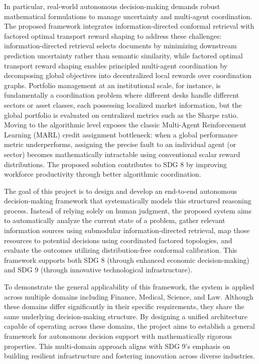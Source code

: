 \documentclass[12pt,a4paper,oneside]{report}
\theoremstyle{definition}
\theoremstyle{remark}
\begin{document}
In particular, real-world autonomous decision-making demands robust mathematical formulations to manage uncertainty and multi-agent coordination. The proposed framework integrates information-directed conformal retrieval with factored optimal transport reward shaping to address these challenges: information-directed retrieval selects documents by minimizing downstream prediction uncertainty rather than semantic similarity, while factored optimal transport reward shaping enables principled multi-agent coordination by decomposing global objectives into decentralized local rewards over coordination graphs. Portfolio management at an institutional scale, for instance, is fundamentally a coordination problem where different desks handle different sectors or asset classes, each possessing localized market information, but the global portfolio is evaluated on centralized metrics such as the Sharpe ratio. Moving to the algorithmic level exposes the classic Multi-Agent Reinforcement Learning (MARL) credit assignment bottleneck: when a global performance metric underperforms, assigning the precise fault to an individual agent (or sector) becomes mathematically intractable using conventional scalar reward distributions. The proposed solution contributes to SDG 8 by improving workforce productivity through better algorithmic coordination.

The goal of this project is to design and develop an end-to-end autonomous decision-making framework that systematically models this structured reasoning process. Instead of relying solely on human judgment, the proposed system aims to automatically analyze the current state of a problem, gather relevant information sources using submodular information-directed retrieval, map those resources to potential decisions using coordinated factored topologies, and evaluate the outcomes utilizing distribution-free conformal calibration. This framework supports both SDG 8 (through enhanced economic decision-making) and SDG 9 (through innovative technological infrastructure).

To demonstrate the general applicability of this framework, the system is applied across multiple domains including Finance, Medical, Science, and Law. Although these domains differ significantly in their specific requirements, they share the same underlying decision-making structure. By designing a unified architecture capable of operating across these domains, the project aims to establish a general framework for autonomous decision support with mathematically rigorous properties. This multi-domain approach aligns with SDG 9's emphasis on building resilient infrastructure and fostering innovation across diverse industries.
\end{document}
